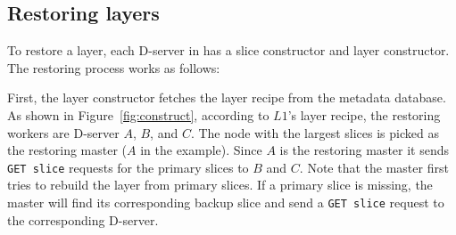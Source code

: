 \subsection{Restoring layers}
\label{sec:restore-desgin}





To restore a layer, each D-server in \sysname has a slice constructor and
layer constructor. The restoring process works as follows:

First, the layer constructor fetches the layer recipe from the metadata database.
As shown in Figure~\ref{fig:construct}, according to $L1$'s layer recipe, 
the restoring workers are D-server $A$, $B$, and $C$. The node with
the largest slices is picked as the restoring master ($A$ in the example).
Since $A$ is the restoring master
it sends \texttt{GET slice} requests for the primary slices to $B$ and $C$.
Note that the master first tries to rebuild the layer from primary slices.
If a primary slice is missing, the master will find its corresponding backup
slice and send a \texttt{GET slice} request to the corresponding D-server.



